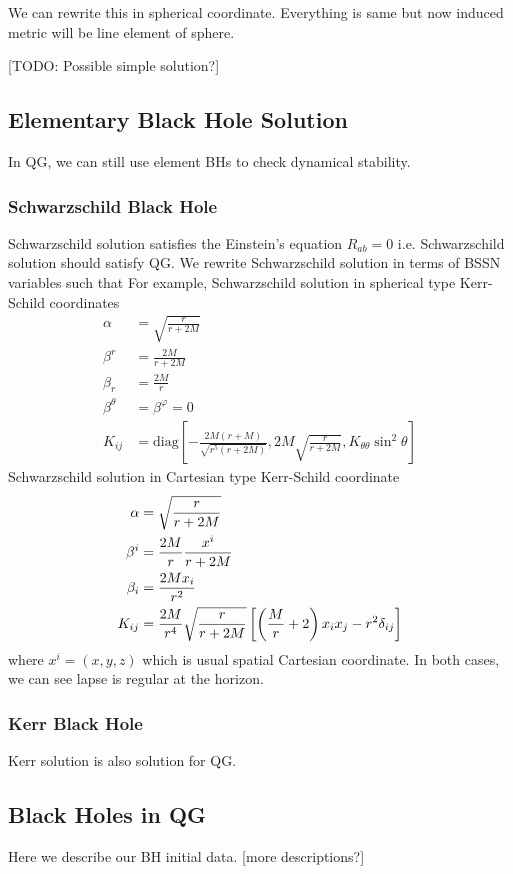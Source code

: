 \documentclass[a4paper,oneside,openany,11pt]{memoir}
\numberwithin{equation}{section} %
\newcommand{\TODO}[1]{{\color{red}[}{\color{red}TODO:} {\color{blue}#1}{\color{red}]}}
\newcommand{\NOTE}[1]{{\color{blue}[#1]}}
\begin{document}
We can rewrite this in spherical coordinate. Everything is same but now
induced metric will be line element of sphere.

\TODO{Possible simple solution?}

\subsection{Elementary Black Hole Solution}

In QG, we can still use element BHs to check 
dynamical stability. 

\subsubsection{Schwarzschild Black Hole}
Schwarzschild solution satisfies the Einstein's equation $R_{ab}=0$ i.e. Schwarzschild solution should
satisfy QG. We rewrite Schwarzschild solution in terms of BSSN variables such that
For example, Schwarzschild solution in spherical type Kerr-Schild coordinates
\begin{align}
\alpha &= \sqrt{\frac{r}{r+2M}} \\
\beta^r &= \frac{2M}{r+2M} \\
\beta_r &=\frac{2M}{r} \\
\beta^\theta &= \beta^\varphi = 0 \\
K_{ij} &= \textrm{diag} \left[ -\frac{2M(r+M)}{\sqrt{r^5 (r+2M)}} , 2M \sqrt{\frac{r}{r+2M}}, K_{\theta \theta} \sin^2 \theta \right]
\end{align}
Schwarzschild solution in Cartesian type Kerr-Schild coordinate
\begin{align}
\alpha &= \sqrt{\frac{r}{r+2M}} \\
\beta^i &= \frac{2M}{r} \frac{x^i}{r+2M} \\
\beta_i &=\frac{2M x_i}{r^2} \\
K_{ij} &= \-\frac{2M}{r^4} \sqrt{\frac{r}{r+2M}} \left[ \left( \frac{M}{r}+2 \right) x_i x_j - r^2 \delta_{ij} \right]
\end{align}
where $x^i = (x,y,z)$ which is usual spatial Cartesian coordinate. In both cases, we can see lapse is regular at the horizon.

\subsubsection{Kerr Black Hole}

Kerr solution is also solution for QG. 

\subsection{Black Holes in QG}
Here we describe our BH initial data. \NOTE{more descriptions?}
\end{document}
